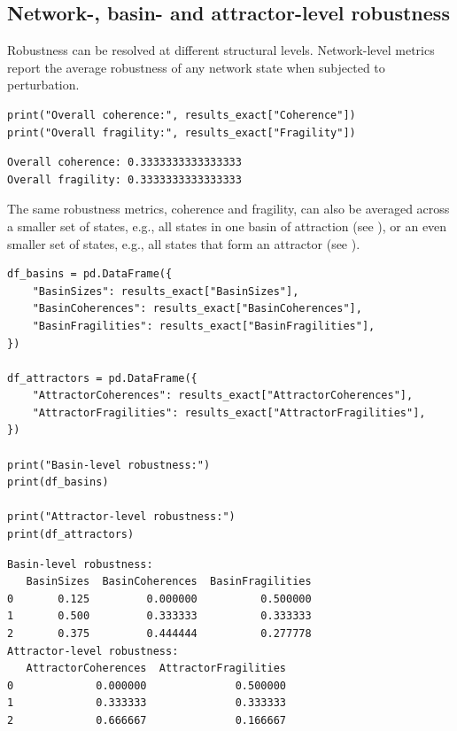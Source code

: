 \documentclass[
]{article}
\begin{document}
\subsection{Network-, basin- and attractor-level
robustness}\label{network--basin--and-attractor-level-robustness}

Robustness can be resolved at different structural levels. Network-level
metrics report the average robustness of any network state when
subjected to perturbation.

\begin{lstlisting}
print("Overall coherence:", results_exact["Coherence"])
print("Overall fragility:", results_exact["Fragility"])
\end{lstlisting}

\begin{lstlisting}
Overall coherence: 0.3333333333333333
Overall fragility: 0.3333333333333333
\end{lstlisting}

The same robustness metrics, coherence and fragility, can also be
averaged across a smaller set of states, e.g., all states in one basin
of attraction (see \citet{bavisetty2025upper}), or an even smaller set
of states, e.g., all states that form an attractor (see
\citet{bavisetty2025attractors}).

\begin{lstlisting}
df_basins = pd.DataFrame({
    "BasinSizes": results_exact["BasinSizes"],
    "BasinCoherences": results_exact["BasinCoherences"],
    "BasinFragilities": results_exact["BasinFragilities"],
})

df_attractors = pd.DataFrame({
    "AttractorCoherences": results_exact["AttractorCoherences"],
    "AttractorFragilities": results_exact["AttractorFragilities"],
})

print("Basin-level robustness:")
print(df_basins)

print("Attractor-level robustness:")
print(df_attractors)
\end{lstlisting}

\begin{lstlisting}
Basin-level robustness:
   BasinSizes  BasinCoherences  BasinFragilities
0       0.125         0.000000          0.500000
1       0.500         0.333333          0.333333
2       0.375         0.444444          0.277778
Attractor-level robustness:
   AttractorCoherences  AttractorFragilities
0             0.000000              0.500000
1             0.333333              0.333333
2             0.666667              0.166667
\end{lstlisting}
\end{document}
